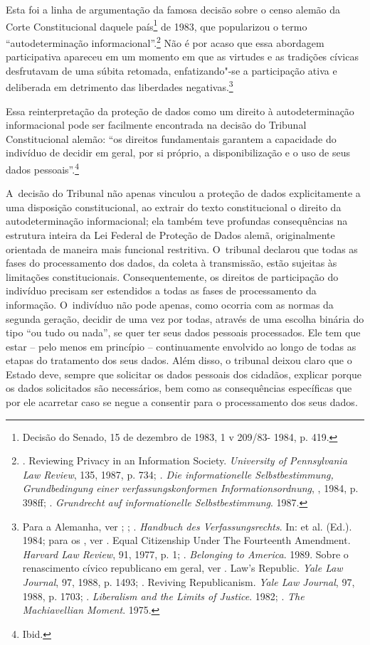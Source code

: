 Esta foi a linha de argumentação da famosa decisão sobre o censo alemão
da Corte Constitucional daquele país\footnote{Decisão do Senado, 15 de
  dezembro de 1983, 1 v 209/83-
  1984, p. 419.} de 1983, que
popularizou o termo ``autodeterminação informacional''.\footnote{.
  Reviewing Privacy in an Information Society. \emph{University of
  Pennsylvania Law Review}, 135, 1987, p. 734; \emph{. Die
  informationelle Selbstbestimmung, Grundbedingung einer
  verfassungskonformen Informationsordnung}, , 1984, p. 398ff;
  . \emph{Grundrecht auf informationelle Selbstbestimmung}.
  1987.} Não é por acaso que essa abordagem participativa apareceu em um
momento em que as virtudes e as tradições cívicas desfrutavam de uma
súbita retomada, enfatizando"-se a participação ativa e deliberada em
detrimento das liberdades negativas.\footnote{Para a Alemanha, ver
  ; ; . \emph{Handbuch des Verfassungsrechts}.
  In:  et al. (Ed.). 1984; para os , ver . Equal
  Citizenship Under The Fourteenth Amendment. \emph{Harvard Law Review},
  91, 1977, p. 1; . \emph{Belonging to America}. 1989. Sobre o
  renascimento cívico republicano em geral, ver . Law's
  Republic. \emph{Yale Law Journal}, 97, 1988, p. 1493; . Reviving
  Republicanism. \emph{Yale Law Journal}, 97, 1988, p. 1703; .
  \emph{Liberalism and the Limits of Justice}. 1982; . \emph{The
  Machiavellian Moment}. 1975.}

Essa reinterpretação da proteção de dados como um direito à
autodeterminação informacional pode ser facilmente encontrada na decisão
do Tribunal Constitucional alemão: ``os direitos fundamentais garantem a
capacidade do indivíduo de decidir em geral, por si próprio, a
disponibilização e o uso de seus dados pessoais''.\footnote{Ibid.}

A~decisão do Tribunal não apenas vinculou a proteção de dados
explicitamente a uma disposição constitucional, ao extrair do texto
constitucional o direito da autodeterminação informacional; ela também
teve profundas consequências na estrutura inteira da Lei Federal de
Proteção de Dados alemã, originalmente orientada de maneira mais
funcional restritiva. O~tribunal declarou que todas as fases do
processamento dos dados, da coleta à transmissão, estão sujeitas às
limitações constitucionais. Consequentemente, os direitos de
participação do indivíduo precisam ser estendidos a todas as fases de
processamento da informação. O~indivíduo não pode apenas, como ocorria
com as normas da segunda geração, decidir de uma vez por todas, através
de uma escolha binária do tipo ``ou tudo ou nada'', se quer ter seus
dados pessoais processados. Ele tem que estar -- pelo menos em
princípio -- continuamente envolvido ao longo de todas as etapas do
tratamento dos seus dados. Além disso, o tribunal deixou claro que o
Estado deve, sempre que solicitar os dados pessoais dos cidadãos,
explicar porque os dados solicitados são necessários, bem como as
consequências específicas que por ele acarretar caso se negue a
consentir para o processamento dos seus dados.

